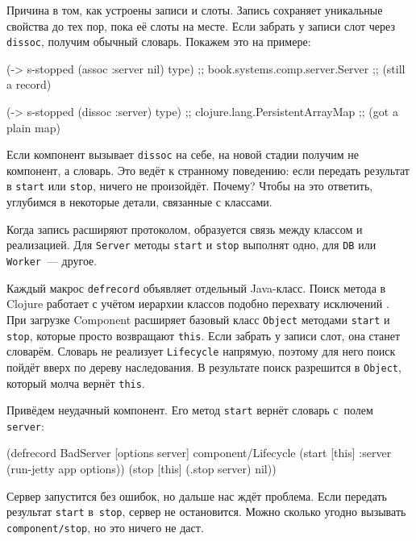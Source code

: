 \fi

Причина в том, как устроены записи и слоты. Запись сохраняет уникальные свойства
до тех пор, пока её слоты на месте. Если забрать у записи слот через
\verb|dissoc|, получим обычный словарь. Покажем это на примере:

\begin{english}
  \begin{clojure}
(-> s-stopped
    (assoc :server nil)
    type)
;; book.systems.comp.server.Server
;; (still a record)

(-> s-stopped
    (dissoc :server)
    type)
;; clojure.lang.PersistentArrayMap
;; (got a plain map)
  \end{clojure}
\end{english}

Если компонент вызывает \verb|dissoc| на себе, на новой стадии получим не
компонент, а словарь. Это ведёт к странному поведению: если передать результат в
\verb|start| или \verb|stop|, ничего не произойдёт. Почему? Чтобы на это
ответить, углубимся в некоторые детали, связанные с классами.

Когда запись расширяют протоколом, образуется связь между классом и
реализацией. Для \verb|Server| методы \verb|start| и \verb|stop| выполнят
одно, для \verb|DB| или \verb|Worker|~--- другое.

Каждый макрос \verb|defrecord| объявляет отдельный Java-класс. Поиск метода в
Clojure работает с учётом иерархии классов подобно перехвату
исключений . При загрузке Component расширяет базовый класс
\verb|Object| методами \verb|start| и \verb|stop|, которые просто возвращают
\verb|this|. Если забрать у записи слот, она станет словарём. Словарь не
реализует \verb|Lifecycle| напрямую, поэтому для него поиск пойдёт вверх по
дереву наследования. В результате поиск разрешится в \verb|Object|, который
молча вернёт \verb|this|.

Привёдем неудачный компонент. Его метод \verb|start| вернёт словарь с~полем
\verb|server|:

\begin{english}
  \begin{clojure}
(defrecord BadServer [options server]
  component/Lifecycle
  (start [this]
    {:server (run-jetty app options)})
  (stop [this]
    (.stop server)
    nil))
  \end{clojure}
\end{english}

Сервер запустится без ошибок, но дальше нас ждёт проблема. Если передать
результат \verb|start| в~\verb|stop|, сервер не остановится. Можно сколько
угодно вызывать \verb|component/stop|, но это ничего не даст.

